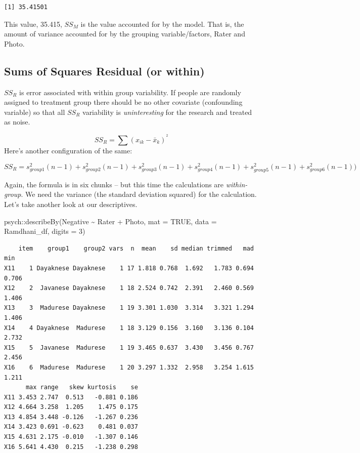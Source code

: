 \documentclass[
  11pt,
]{book}
\newenvironment{Shaded}{\begin{snugshade}}{\end{snugshade}}
\newcommand{\AttributeTok}[1]{\textcolor[rgb]{0.77,0.63,0.00}{#1}}
\newcommand{\ConstantTok}[1]{\textcolor[rgb]{0.00,0.00,0.00}{#1}}
\newcommand{\DecValTok}[1]{\textcolor[rgb]{0.00,0.00,0.81}{#1}}
\newcommand{\FunctionTok}[1]{\textcolor[rgb]{0.00,0.00,0.00}{#1}}
\newcommand{\NormalTok}[1]{#1}
\newcommand{\SpecialCharTok}[1]{\textcolor[rgb]{0.00,0.00,0.00}{#1}}
\begin{document}
\begin{verbatim}
[1] 35.41501
\end{verbatim}

This value, 35.415, \(SS_M\) is the value accounted for by the model. That is, the amount of variance accounted for by the grouping variable/factors, Rater and Photo.

\hypertarget{sums-of-squares-residual-or-within-1}{%
\subsection{Sums of Squares Residual (or within)}\label{sums-of-squares-residual-or-within-1}}

\(SS_R\) is error associated with within group variability. If people are randomly assigned to treatment group there should be no other covariate (confounding variable) so that all \(SS_R\) variability is \emph{uninteresting} for the research and treated as noise.

\[SS_{R}= \sum(x_{ik}-\bar{x}_{k})^{^{2}}\]
Here's another configuration of the same:

\[SS_{R}= s_{group1}^{2}(n-1) + s_{group2}^{2}(n-1) + s_{group3}^{2}(n-1) + s_{group4}^{2}(n-1) + s_{group5}^{2}(n-1) + s_{group6}^{2}(n-1))\]

Again, the formula is in six chunks -- but this time the calculations are \emph{within-group}. We need the variance (the standard deviation squared) for the calculation. Let's take another look at our descriptives.

\begin{Shaded}
\begin{Highlighting}[]
\NormalTok{psych}\SpecialCharTok{::}\FunctionTok{describeBy}\NormalTok{(Negative }\SpecialCharTok{\textasciitilde{}}\NormalTok{ Rater }\SpecialCharTok{+}\NormalTok{ Photo, }\AttributeTok{mat =} \ConstantTok{TRUE}\NormalTok{, }\AttributeTok{data =}\NormalTok{ Ramdhani\_df,}
    \AttributeTok{digits =} \DecValTok{3}\NormalTok{)}
\end{Highlighting}
\end{Shaded}

\begin{verbatim}
    item    group1    group2 vars  n  mean    sd median trimmed   mad   min
X11    1 Dayaknese Dayaknese    1 17 1.818 0.768  1.692   1.783 0.694 0.706
X12    2  Javanese Dayaknese    1 18 2.524 0.742  2.391   2.460 0.569 1.406
X13    3  Madurese Dayaknese    1 19 3.301 1.030  3.314   3.321 1.294 1.406
X14    4 Dayaknese  Madurese    1 18 3.129 0.156  3.160   3.136 0.104 2.732
X15    5  Javanese  Madurese    1 19 3.465 0.637  3.430   3.456 0.767 2.456
X16    6  Madurese  Madurese    1 20 3.297 1.332  2.958   3.254 1.615 1.211
      max range   skew kurtosis    se
X11 3.453 2.747  0.513   -0.881 0.186
X12 4.664 3.258  1.205    1.475 0.175
X13 4.854 3.448 -0.126   -1.267 0.236
X14 3.423 0.691 -0.623    0.481 0.037
X15 4.631 2.175 -0.010   -1.307 0.146
X16 5.641 4.430  0.215   -1.238 0.298
\end{verbatim}
\end{document}
